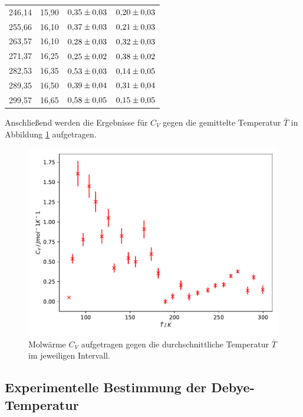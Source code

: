 \begin{table}
\begin{tabular}{c c c c}
        246,14 & 15,90 & $\num{0.35+-0.03}$ & $\num{0.20+-0.03}$\\
        255,66 & 16,10 & $\num{0.37+-0.03}$ & $\num{0.21+-0.03}$\\
        263,57 & 16,10 & $\num{0.28+-0.03}$ & $\num{0.32+-0.03}$\\
        271,37 & 16,25 & $\num{0.25+-0.02}$ & $\num{0.38+-0.02}$\\
        282,53 & 16,35 & $\num{0.53+-0.03}$ & $\num{0.14+-0.05}$\\
        289,35 & 16,50 & $\num{0.39+-0.04}$ & $\num{0.31+-0.04}$\\
        299,57 & 16,65 & $\num{0.58+-0.05}$ & $\num{0.15+-0.05}$\\
    \bottomrule
    \end{tabular}
\end{table}

Anschließend werden die Ergebnisse für $C_V$ gegen die gemittelte Temperatur $\bar{T}$ in Abbildung \ref{fig:plot} aufgetragen. 

\begin{figure}
  \centering
  \includegraphics{content/plot1.pdf}
  \caption{Molwärme $C_V$ aufgetragen gegen die durchschnittliche Temperatur $\bar{T}$ im jeweiligen Intervall.}
  \label{fig:plot}
\end{figure}

\subsection{Experimentelle Bestimmung der Debye-Temperatur}

